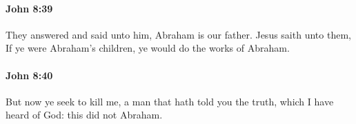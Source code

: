 		\paragraph{John 8:39} %
			\label{JOHN-8-39}

			They answered and said unto him, Abraham is our father. Jesus saith unto them, If ye were Abraham's children, ye would do the works of Abraham.

			\begin{framed}
				\scriptsize
				\begin{compactdesc}
					\item[SBLG] 
				\end{compactdesc}
			\end{framed}

		\paragraph{John 8:40} %
			\label{JOHN-8-40}

			But now ye seek to kill me, a man that hath told you the truth, which I have heard of God: this did not Abraham.

